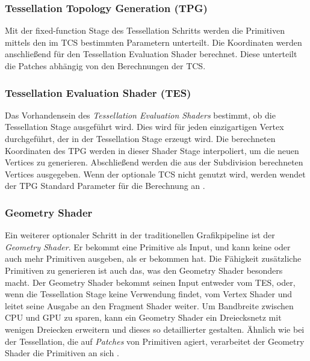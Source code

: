 \subsubsection*{Tessellation Topology Generation (TPG)}
Mit der fixed-function Stage des Tessellation Schritts werden die Primitiven mittels den im TCS bestimmten Parametern unterteilt.
Die Koordinaten werden anschließend für den Tessellation Evaluation Shader berechnet.
Diese unterteilt die Patches abhängig von den Berechnungen der TCS.

\subsubsection*{Tessellation Evaluation Shader (TES)}
Das Vorhandensein des \textit{Tessellation Evaluation Shaders} bestimmt, ob die Tessellation Stage ausgeführt wird.
Dies wird für jeden einzigartigen Vertex durchgeführt, der in der Tessellation Stage erzeugt wird.
Die berechneten Koordinaten des TPG werden in dieser Shader Stage interpoliert, um die neuen Vertices zu generieren.
Abschließend werden die aus der Subdivision berechneten Vertices ausgegeben. 
Wenn der optionale TCS nicht genutzt wird, werden wendet der TPG Standard Parameter für die Berechnung an \cite{cozzi2012opengl}\cite{Carvalho2022}.

\subsubsection{Geometry Shader}
\label{subsubsec:geometry_shader}
Ein weiterer optionaler Schritt in der traditionellen Grafikpipeline ist der \textit{Geometry Shader}.
Er bekommt eine Primitive als Input, und kann keine oder auch mehr Primitiven ausgeben, als er bekommen hat.
Die Fähigkeit zusätzliche Primitiven zu generieren ist auch das, was den Geometry Shader besonders macht.
Der Geometry Shader bekommt seinen Input entweder vom TES, oder, wenn die Tessellation Stage keine Verwendung findet, vom Vertex Shader und leitet seine Ausgabe an den Fragment Shader weiter.
Um Bandbreite zwischen CPU und GPU zu sparen, kann ein Geometry Shader ein Dreiecksnetz mit wenigen Dreiecken erweitern und dieses so detaillierter gestalten.
Ähnlich wie bei der Tessellation, die auf \textit{Patches} von Primitiven agiert, verarbeitet der Geometry Shader die Primitiven an sich \cite{Chang2014}.


